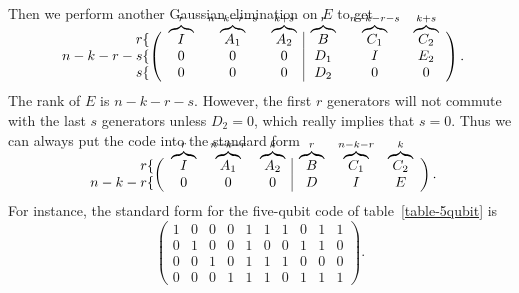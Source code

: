 \documentclass{report}
\begin{document}
Then we perform another Gaussian elimination on $E$ to get
\vspace{2.5ex}
\begin{equation}
\begin{array}{r} r\{ \\ n-k-r-s \{ \\ s \{ \end{array} \!\!\!\!
\left( \begin{array}{ccc|ccc}
\raisebox{0ex}[1.5ex]{$\overbrace{I}^r$} & 
\raisebox{0ex}[1.5ex]{$\overbrace{A_1}^{n-k-r-s}$} & 
\raisebox{0ex}[1.5ex]{$\overbrace{A_2}^{k+s}$} & 
\raisebox{0ex}[1.5ex]{$\overbrace{B}^r$} & 
\raisebox{0ex}[1.5ex]{$\overbrace{C_1}^{n-k-r-s}$} & 
\raisebox{0ex}[1.5ex]{$\overbrace{C_2}^{k+s}$} \\
0 & 0 & 0 & D_1 & I & E_2 \\
0 & 0 & 0 & D_2 & 0 & 0
\end{array} \right).
\end{equation}
The rank of $E$ is $n-k-r-s$.  However, the first $r$ generators will not 
commute with the last $s$ generators unless $D_2 = 0$, which really implies 
that $s=0$.  Thus we can always put the code into the standard form
\vspace{2.5ex}
\begin{equation}
\begin{array}{r} r\{ \\ n-k-r\{ \end{array} \!\!\!\!
\left( \begin{array}{ccc|ccc}
\raisebox{0ex}[1.5ex]{$\overbrace{I}^r$} & 
\raisebox{0ex}[1.5ex]{$\overbrace{A_1}^{n-k-r}$} & 
\raisebox{0ex}[1.5ex]{$\overbrace{A_2}^k$} & 
\raisebox{0ex}[1.5ex]{$\overbrace{B}^r$} & 
\raisebox{0ex}[1.5ex]{$\overbrace{C_1}^{n-k-r}$} & 
\raisebox{0ex}[1.5ex]{$\overbrace{C_2}^k$} \\
0 & 0 & 0 & D & I & E
\end{array} \right).
\label{eq-standard-form}
\end{equation}
For instance, the standard form for the five-qubit code of 
table~\ref{table-5qubit} is
\begin{equation}
\left( \begin{array}{ccccc|ccccc}
1 & 0 & 0 & 0 & 1 & 1 & 1 & 0 & 1 & 1 \\
0 & 1 & 0 & 0 & 1 & 0 & 0 & 1 & 1 & 0 \\
0 & 0 & 1 & 0 & 1 & 1 & 1 & 0 & 0 & 0 \\
0 & 0 & 0 & 1 & 1 & 1 & 0 & 1 & 1 & 1
\end{array} \right).
\end{equation}
\end{document}
